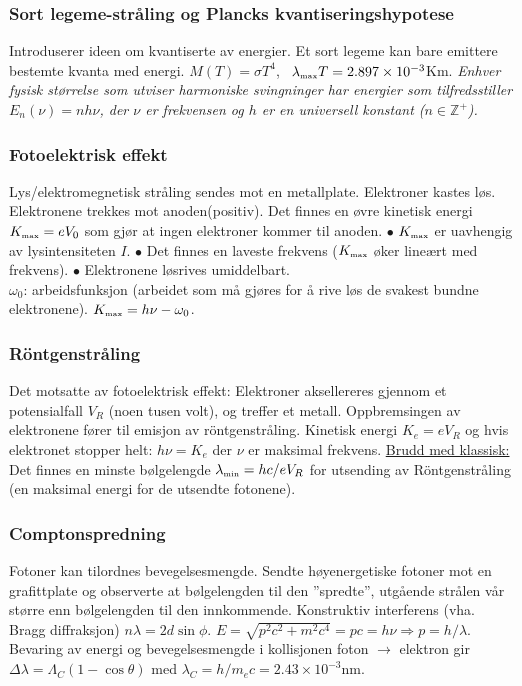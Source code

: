 \documentclass[a4paper, norsk, 8pt]{article}
\begin{document}
\begin{multicols*}{3}
\subsubsection*{\scriptsize Sort legeme-stråling og Plancks kvantiseringshypotese}
Introduserer ideen om kvantiserte av energier. Et sort legeme kan bare emittere bestemte kvanta med energi.
$M(T)=\sigma T^4$, \ $\lambda_{\tiny \mbox{max}}T=2.897\times10^{-3}$Km. \textit{Enhver fysisk størrelse som utviser harmoniske svingninger har energier som tilfredsstiller $E_n(\nu)=nh\nu$, der $\nu$ er frekvensen og $h$ er en universell konstant ($n\in \mathbb{Z}^+$).}


\subsubsection*{\scriptsize Fotoelektrisk effekt} 
Lys/elektromegnetisk stråling sendes mot en metallplate. Elektroner kastes løs. Elektronene trekkes mot anoden(positiv). Det finnes en øvre kinetisk energi $K_{\tiny \mbox{max}}=eV_0$ som gjør at ingen elektroner kommer til anoden. $\bullet$ $K_{\tiny \mbox{max}}$ er uavhengig av lysintensiteten $I$. $\bullet$ Det finnes en laveste frekvens ($K_{\tiny \mbox{max}}$ øker lineært med frekvens). $\bullet$ Elektronene løsrives umiddelbart.\\
$\omega_0$: arbeidsfunksjon (arbeidet som må gjøres for å rive løs de svakest bundne elektronene). $K_{\tiny \mbox{max}}=h\nu-\omega_0$.


\subsubsection*{\scriptsize Röntgenstråling} 
Det motsatte av fotoelektrisk effekt: Elektroner aksellereres gjennom et potensialfall $V_R$ (noen tusen volt), og treffer et metall. Oppbremsingen av elektronene fører til emisjon av röntgenstråling. Kinetisk energi $K_e=eV_R$ og hvis elektronet stopper helt: $h\nu=K_e$ der $\nu$ er maksimal frekvens. \underline{Brudd med klassisk:} Det finnes en minste bølgelengde $\lambda_{\tiny \mbox{min}}=hc/eV_R$ for utsending av Röntgenstråling (en maksimal energi for de utsendte fotonene).


\subsubsection*{\scriptsize Comptonspredning} 
Fotoner kan tilordnes bevegelsesmengde. Sendte høyenergetiske fotoner mot en grafittplate og observerte at bølgelengden til den ''spredte'', utgående strålen vår større enn bølgelengden til den innkommende. Konstruktiv interferens (vha. Bragg diffraksjon) $n\lambda=2d\sin \phi$.
$E=\sqrt{p^2c^2+m^2c^4}=pc=h\nu \Rightarrow p=h/\lambda$. Bevaring av energi og bevegelsesmengde i kollisjonen foton $\rightarrow$ elektron gir $\Delta \lambda = \Lambda_C(1-\cos \theta)$ med $\lambda_C=h/m_e c = 2.43\times 10^{-3}$nm.



\end{multicols*}
\end{document}
